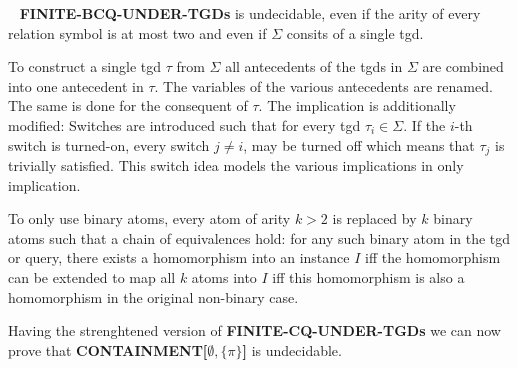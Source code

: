 \begin{theorem}\label{fundplus}~\cite{pichler2014containment}
	\textbf{FINITE-BCQ-UNDER-TGDs} is undecidable, even if the arity of every relation
	symbol is at most two and even if $\Sigma$ consits of a single tgd.
\end{theorem}

\begin{proofidea}
To construct a single tgd $\tau$ from $\Sigma$ all antecedents of the tgds in
$\Sigma$ are combined into one antecedent in $\tau$. The variables of the
various antecedents are renamed. The same is done for the consequent of $\tau$.
The implication is additionally modified: Switches are introduced such that for
every tgd $\tau_i \in \Sigma$. If the $i$-th switch is turned-on, every switch
$j\neq i$, may be turned off which means that $\tau_j$ is trivially satisfied.
This switch idea models the various implications in only implication.

To only use binary atoms, every atom of arity $k>2$ is replaced by $k$ binary
atoms such that a chain of equivalences hold: for any such binary atom in the
tgd or query, there exists a homomorphism into an instance $I$ iff the
homomorphism can be extended to map all $k$ atoms into $I$ iff this
homomorphism is also a homomorphism in the original non-binary case.
\end{proofidea}

Having the strenghtened version of \textbf{FINITE-CQ-UNDER-TGDs} we can now
prove that \textbf{CONTAINMENT[$\emptyset,\{\pi\}$]} is undecidable.

